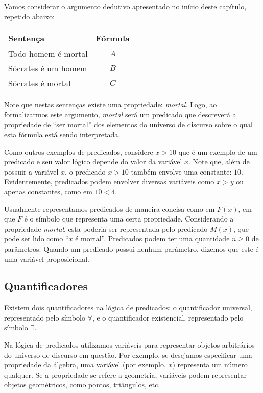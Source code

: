 \begin{Example}
Vamos considerar o argumento dedutivo apresentado no início deste
capítulo, repetido abaixo:

\begin{table}[h]
  \begin{tabular}{|l|c|}
    \hline
    Sentença & Fórmula \\ \hline
    Todo homem é mortal & $A$ \\
    Sócrates é um homem & $B$ \\
    Sócrates é mortal & $C$ \\\hline
  \end{tabular}
  \centering
\end{table}
Note que nestas sentenças existe uma propriedade:
\textit{mortal}. Logo, ao formalizarmos este argumento,
\textit{mortal} será um predicado que descreverá a propriedade de
``ser mortal'' dos elementos do universo de discurso sobre o qual esta
fórmula está sendo interpretada.

Como outros exemplos de predicados, considere  $x > 10$ que é um exemplo de um predicado e seu
valor lógico depende do valor da variável $x$. Note que, além de
possuir a variável $x$, o predicado $x > 10$ também envolve uma
constante: $10$. Evidentemente,
predicados podem envolver diversas variáveis como $x > y$ ou
apenas constantes, como em $10 < 4$.
\end{Example}

Usualmente representamos predicados de maneira concisa como em $F(x)$,
em que $F$ é o símbolo que representa uma certa
propriedade. Considerando a propriedade \textit{mortal}, esta poderia
ser representada pelo predicado $M(x)$, que pode ser lido como ``$x$ é
mortal''. Predicados podem ter uma quantidade $n \geq 0$ de
parâmetros. Quando um predicado possui nenhum parâmetro, dizemos que
este é uma variável proposicional.

\subsection{Quantificadores}

Existem dois quantificadores na lógica de predicados: o quantificador universal,
representado pelo símbolo $\forall$, e o quantificador existencial,
representado pelo símbolo $\exists$.

Na lógica de predicados utilizamos variáveis para representar objetos
arbitrários do universo de discurso em questão. Por exemplo, se
desejamos especificar uma propriedade da álgebra, uma variável (por
exemplo, $x$) representa um número qualquer. Se a propriedade se
refere a geometria, variáveis podem representar objetos geométricos,
como pontos, triângulos, etc.

